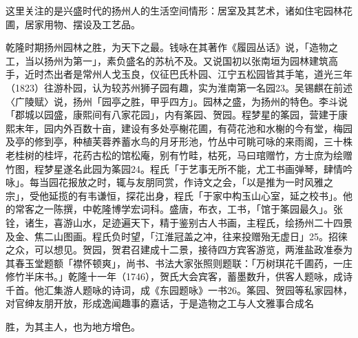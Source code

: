 \vfill
\begin{BookNotes}
\end{BookNotes}


这里关注的是兴盛时代的扬州人的生活空间情形：居室及其艺术，诸如住宅园林花圃，居家用物、摆设及工艺品。

乾隆时期扬州园林之胜，为天下之最。钱咏在其著作《履园丛话》说，「造物之工，当以扬州为第一」，素负盛名的苏杭不及。又说国初以张南垣为园林建筑高手，近时杰出者是常州人戈玉良，仪征巴氏朴园、江宁五松园皆其手笔，道光三年（1823）往游朴园，认为较苏州狮子园有趣，实为淮南第一名园23。吴锡麒在前述〈广陵赋〉说，扬州「园亭之胜，甲乎四方」。园林之盛，为扬州的特色。李斗说「郡城以园盛，康熙间有八家花园」，内有筿园、贺园。程梦星的筿园，营建于康熙末年，园内外百数十亩，建设有多处亭榭花圃，有荷花池和水榭的今有堂，梅园及亭的修到亭，种植芙蓉养蓄水鸟的月牙形池，竹丛中可眺可咏的来雨阁，三十株老桂树的桂坪，花药古松的馆松庵，别有竹畦，枯死，马曰琯赠竹，方士庶为绘赠竹图，程梦星遂名此园为筿园24。程氏「于艺事无所不能，尤工书画弹琴，肆情吟咏」。每当园花报放之时，辄与友朋同赏，作诗文之会，「以是推为一时风雅之宗」，受他延揽的有韦谦恒，探花出身，程氏「于家中构玉山心室，延之校书」。他的常客之一陈撰，中乾隆博学宏词科。盛唐，布衣，工书，「馆于筿园最久」。张铨，诸生，喜游山水，足迹遍天下，精于鉴别古人书画，主程氏，绘扬州二十四景及金、焦二山图画。程氏负时望，「江淮冠盖之冲，往来投赠殆无虚日」25。招徕之众，可以想见。贺园，贺君召建成十二景，接待四方宾客游览，两淮盐政准泰为其春玉堂题额「襟怀顿爽」，尚书、书法大家张照则题联：「万树琪花千圃药，一庄修竹半床书。」乾隆十一年（1746），贺氏大会宾客，蓄墨数升，供客人题咏，成诗千首。他汇集游人题咏的诗词，成《东园题咏》一书26。筿园、贺园等私家园林，对官绅友朋开放，形成逸闻趣事的嘉话，于是造物之工与人文雅事合成名

\vfill
\begin{BookNotes}
\end{BookNotes}

\noindent 胜，为其主人，也为地方增色。

